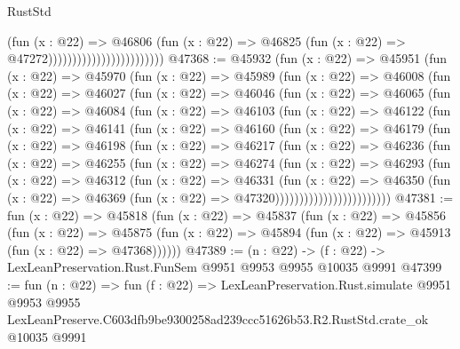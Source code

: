 \begin{lexlean}{RustStd}
\begin{coremodule}
                                              (fun (x : @22) =>
                                              @46806
                                                (fun (x : @22) =>
                                                @46825
                                                  (fun (x : @22) => @47272))))))))))))))))))))))))
@47368 := @45932
    (fun (x : @22) =>
    @45951
      (fun (x : @22) =>
      @45970
        (fun (x : @22) =>
        @45989
          (fun (x : @22) =>
          @46008
            (fun (x : @22) =>
            @46027
              (fun (x : @22) =>
              @46046
                (fun (x : @22) =>
                @46065
                  (fun (x : @22) =>
                  @46084
                    (fun (x : @22) =>
                    @46103
                      (fun (x : @22) =>
                      @46122
                        (fun (x : @22) =>
                        @46141
                          (fun (x : @22) =>
                          @46160
                            (fun (x : @22) =>
                            @46179
                              (fun (x : @22) =>
                              @46198
                                (fun (x : @22) =>
                                @46217
                                  (fun (x : @22) =>
                                  @46236
                                    (fun (x : @22) =>
                                    @46255
                                      (fun (x : @22) =>
                                      @46274
                                        (fun (x : @22) =>
                                        @46293
                                          (fun (x : @22) =>
                                          @46312
                                            (fun (x : @22) =>
                                            @46331
                                              (fun (x : @22) =>
                                              @46350
                                                (fun (x : @22) =>
                                                @46369
                                                  (fun (x : @22) => @47320))))))))))))))))))))))))
@47381 := fun (x : @22) =>
  @45818
    (fun (x : @22) =>
    @45837
      (fun (x : @22) =>
      @45856
        (fun (x : @22) =>
        @45875 (fun (x : @22) => @45894 (fun (x : @22) => @45913 (fun (x : @22) => @47368))))))
@47389 := (n : @22) -> (f : @22) -> LexLeanPreservation.Rust.FunSem @9951 @9953 @9955 @10035 @9991
@47399 := fun (n : @22) =>
  fun (f : @22) =>
  LexLeanPreservation.Rust.simulate
    @9951
    @9953
    @9955
    LexLeanPreserve.C603dfb9be9300258ad239ccc51626b53.R2.RustStd.crate_ok
    @10035
    @9991
\end{coremodule}
\end{lexlean}
